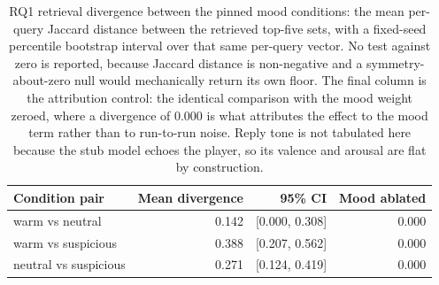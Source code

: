 \begin{table}[tb]
  \centering
  \caption{%
    RQ1 retrieval divergence between the pinned mood conditions: the mean per-query Jaccard distance
    between the retrieved top-five sets, with a fixed-seed percentile bootstrap interval over that
    same per-query vector. No test against zero is reported, because Jaccard distance is
    non-negative and a symmetry-about-zero null would mechanically return its own floor. The final
    column is the attribution control: the identical comparison with the mood weight zeroed, where a
    divergence of 0.000 is what attributes the effect to the mood term rather than to run-to-run
    noise. Reply tone is not tabulated here because the stub model echoes the player, so its valence
    and arousal are flat by construction.
  }
  \label{tab:embr-rq1-divergence}
  \small
  \begin{tabular}{lrrr}
    \toprule
    Condition pair & Mean divergence & 95\% CI & Mood ablated \\
    \midrule
    warm vs neutral & 0.142 & [0.000, 0.308] & 0.000 \\
    warm vs suspicious & 0.388 & [0.207, 0.562] & 0.000 \\
    neutral vs suspicious & 0.271 & [0.124, 0.419] & 0.000 \\
    \bottomrule
  \end{tabular}
\end{table}
